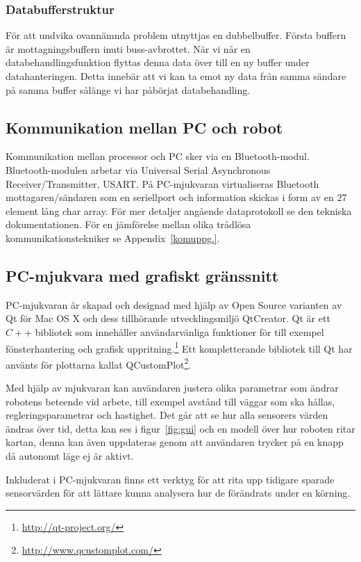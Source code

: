 \documentclass[a4paper,12pt,fleqn]{article}
\begin{document}
\subsubsection{Databufferstruktur}
För att undvika ovannämnda problem utnyttjas en dubbelbuffer. Första buffern är mottagningsbuffern inuti buss-avbrottet. När vi når en databehandlingsfunktion flyttas denna data över till en ny buffer under datahanteringen. Detta innebär att vi kan ta emot ny data från samma sändare på samma buffer sålänge vi har påbörjat databehandling.

\subsection{Kommunikation mellan PC och robot}
Kommunikation mellan processor och PC sker via en Bluetooth-modul. Bluetooth-modulen arbetar via Universal Serial Asynchronous Receiver/Transmitter, USART.
På PC-mjukvaran virtualiseras Bluetooth mottagaren/sändaren som en seriellport och information skickas i form av en 27 element lång char array. För mer detaljer angående dataprotokoll se den tekniska dokumentationen. För en jämförelse mellan olika trådlösa kommunikationstekniker se Appendix~\ref{komuppg.}.

\subsection{PC-mjukvara med grafiskt gränssnitt}

PC-mjukvaran är skapad och designad med hjälp av Open Source varianten av Qt för Mac OS X och dess tillhörande utvecklingsmiljö QtCreator. Qt är ett $C++$ bibliotek som innehåller användarvänliga funktioner för till exempel fönsterhantering och grafisk uppritning.\footnote{\url{http://qt-project.org/}} Ett kompletterande bibliotek till Qt har använts för plottarna kallat QCustomPlot\footnote{\url{http://www.qcustomplot.com/}}.

Med hjälp av mjukvaran kan användaren justera olika parametrar som ändrar robotens beteende vid arbete, till exempel avstånd till väggar som ska hållas, regleringsparametrar och hastighet. Det går att se hur alla sensorers värden ändras över tid, detta kan ses i figur~\ref{fig:gui} och en modell över hur roboten ritar kartan, denna kan även uppdateras genom att användaren trycker på en knapp då autonomt läge ej är aktivt.

Inkluderat i PC-mjukvaran finns ett verktyg för att rita upp tidigare sparade sensorvärden för att lättare kunna analysera hur de förändrats under en körning.
\end{document}
